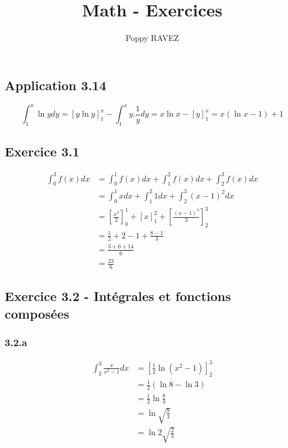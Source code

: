 \documentclass[a4paper,10pt]{report}
\title{Math - Exercices}
\author{Poppy RAVEZ}
\begin{document}
\subsection*{Application 3.14}
\begin{displaymath}
	\int_1^x \ln y dy = [y\ln y]_1^x -\int_1^x y.\frac{1}{y}dy = x \ln x - [y]_1^x = x(\ln x -1) + 1
\end{displaymath}

\subsection*{Exercice 3.1}
\begin{equation*}
	\begin{split}
	\int_0^3 f(x)dx &= \int_0^1 f(x)dx + \int_1^2 f(x)dx +\int_2^3 f(x)dx\\
	                &= \int_0^1 x dx + \int_1^2 1 dx + \int_2^3 (x-1)^2dx \\
	                &= \left[ \frac{x^2}{2} \right]_0^1 +  \left[ x \right]_1^2 + \left[ \frac{(x-1)^3}{3} \right]_2^3 \\
	                &= \frac{1}{2} + 2 - 1 + \frac{8-1}{3} \\
	                &= \frac{3+6+14}{6} \\
	                &= \frac{23}{6}
	\end{split}
\end{equation*}

\subsection*{Exercice 3.2 - Intégrales et fonctions composées}

\subsubsection*{3.2.a}
\begin{equation*}
	\begin{split}
		\int_2^3 \frac{x}{x^2-1}dx &= \left[ \frac{1}{2}\ln(x^2-1) \right]_2^3\\
			                       &= \frac{1}{2} (\ln 8 - \ln 3) \\
			                       &= \frac{1}{2} \ln \frac{8}{3} \\
			                       &= \ln \sqrt{\frac{8}{3}} \\
			                       &= \ln 2\sqrt{\frac{2}{3}}
	\end{split}
\end{equation*}
\end{document}
